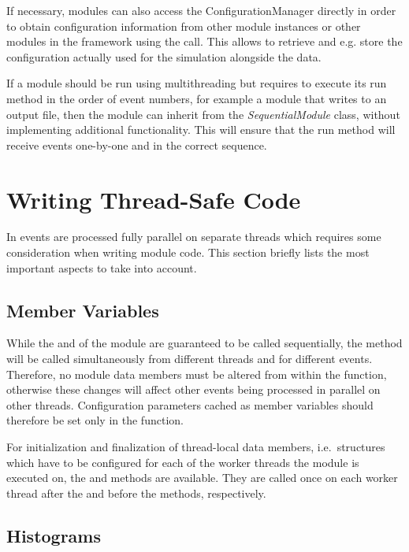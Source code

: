 If necessary, modules can also access the ConfigurationManager directly in order to obtain configuration information from other module instances or other modules in the framework using the  call.
This allows to retrieve and e.g. store the configuration actually used for the simulation alongside the data.

If a module should be run using multithreading but requires to execute its run method in the order of event numbers, for example a module that writes to an output file, then the module can inherit from the \textit{SequentialModule} class, without implementing additional functionality.
This will ensure that the run method will receive events one-by-one and in the correct sequence.


\section{Writing Thread-Safe Code}
\label{sec:module_multithreading}

In \apsq events are processed fully parallel on separate threads which requires some consideration when writing module code.
This section briefly lists the most important aspects to take into account.

\subsection{Member Variables}
\label{sec:multithreading_members}

While the  and  of the module are guaranteed to be called sequentially, the  method will be called simultaneously from different threads and for different events.
Therefore, no module data members must be altered from within the  function, otherwise these changes will affect other events being processed in parallel on other threads.
Configuration parameters cached as member variables should therefore be set only in the  function.

For initialization and finalization of thread-local data members, i.e.\ structures which have to be configured for each of the worker threads the module is executed on, the  and  methods are available. They are called once on each worker thread after the  and before the  methods, respectively.

\subsection{Histograms}

